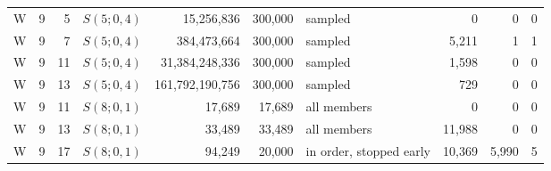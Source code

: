 \begin{tabular}{@{}lrrlrrlrrr@{}}
W & 9 & 5 & $S(5;0,4)$ & 15{,}256{,}836 & 300{,}000 & sampled & 0 & 0 & 0\\
W & 9 & 7 & $S(5;0,4)$ & 384{,}473{,}664 & 300{,}000 & sampled & 5{,}211 & 1 & 1\\
W & 9 & 11 & $S(5;0,4)$ & 31{,}384{,}248{,}336 & 300{,}000 & sampled & 1{,}598 & 0 & 0\\
W & 9 & 13 & $S(5;0,4)$ & 161{,}792{,}190{,}756 & 300{,}000 & sampled & 729 & 0 & 0\\
W & 9 & 11 & $S(8;0,1)$ & 17{,}689 & 17{,}689 & all members & 0 & 0 & 0\\
W & 9 & 13 & $S(8;0,1)$ & 33{,}489 & 33{,}489 & all members & 11{,}988 & 0 & 0\\
W & 9 & 17 & $S(8;0,1)$ & 94{,}249 & 20{,}000 & in order, stopped early & 10{,}369 & 5{,}990 & 5\\
\bottomrule
\end{tabular}
